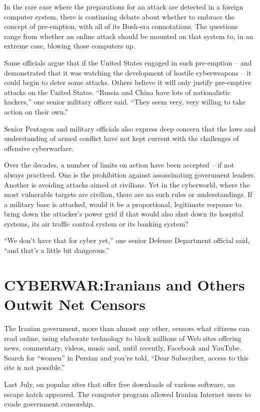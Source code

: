 \documentclass[12pt,a4paper,onecolumn]{article}
\begin{document}
In the rare case where the preparations for an attack are detected in a foreign computer system,
there is continuing debate about whether to embrace the concept of pre-emption, with all of its
Bush-era connotations. The questions range from whether an online attack should be mounted on that
system to, in an extreme case, blowing those computers up.

Some officials argue that if the United States engaged in such pre-emption -- and demonstrated that
it was watching the development of hostile cyberweapons -- it could begin to deter some attacks.
Others believe it will only justify pre-emptive attacks on the United States. ``Russia and China
have lots of nationalistic hackers,'' one senior military officer said. ``They seem very, very
willing to take action on their own.''

Senior Pentagon and military officials also express deep concern that the laws and understanding of
armed conflict have not kept current with the challenges of offensive cyberwarfare.

Over the decades, a number of limits on action have been accepted -- if not always practiced. One is
the prohibition against assassinating government leaders. Another is avoiding attacks aimed at
civilians. Yet in the cyberworld, where the most vulnerable targets are civilian, there are no such
rules or understandings. If a military base is attacked, would it be a proportional, legitimate
response to bring down the attacker's power grid if that would also shut down its hospital systems,
its air traffic control system or its banking system?

``We don't have that for cyber yet,'' one senior Defense Department official said, ``and that's a
little bit dangerous.''

\section{CYBERWAR:Iranians and Others Outwit Net Censors}

The Iranian government, more than almost any other, censors what citizens can read online, using
elaborate technology to block millions of Web sites offering news, commentary, videos, music and,
until recently, Facebook and YouTube. Search for ``women'' in Persian and you're told, ``Dear
Subscriber, access to this site is not possible.''

Last July, on popular sites that offer free downloads of various software, an escape hatch appeared.
The computer program allowed Iranian Internet users to evade government censorship.
\end{document}

